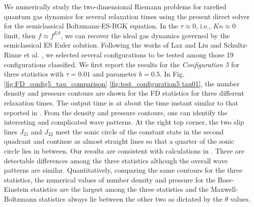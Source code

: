 \documentclass[twocolumn,prX]{revtex4} %
\begin{document}
We numerically study the two-dimensional Riemann problems for rarefied quantum gas dynamics for several relaxation times using the present direct solver for the semiclassical Boltzmann-ES-BGK equation.   In the $\tau \approx 0$, i.e.,  $Kn \approx 0$ limit, then $f \approx f^{ES}$, we can recover the ideal gas dynamics governed by the semiclassical ES Euler solution.  Following the works of Lax and Liu \cite{Laxliu95} and Schultz-Rinne et al. \cite{schultzrinne},  we selected several configurations to be tested among those 19 configurations classified.  We first report the results for the \emph{Configuration 5} for three statistics with $\tau=0.01$ and parameter $b=0.5$. In Fig. \ref{fig:FD_config5_tau_comparison} \ref{fig:test_configuration5 tau01}, the number density and pressure contours are shown for the FD statistics for three different relaxation times.  The output time is at about the time instant similar to that reported in \cite{Laxliu95}\cite{schultzrinne}.  From the density and pressure contours, one can identify the interesting and complicated wave patterns.   At the right top corner, the two slip lines $J_{21}$ and $J_{32}$ meet the sonic circle of the constant state in the second quadrant and continue as almost straight lines so that a quarter of the sonic circle lies in between.  Our results are consistent with calculations in \cite{Laxliu95}\cite{schultzrinne}.  There are detectable differences among the three statistics although the overall wave patterns are similar. Quantitatively, comparing the same contours for the three statistics, the numerical values of number density and pressure for the Bose-Einstein statistics are the largest among the three statistics and the Maxwell-Boltzmann statistics always lie between the other two as dictated by the $\theta$ values.
\end{document}
